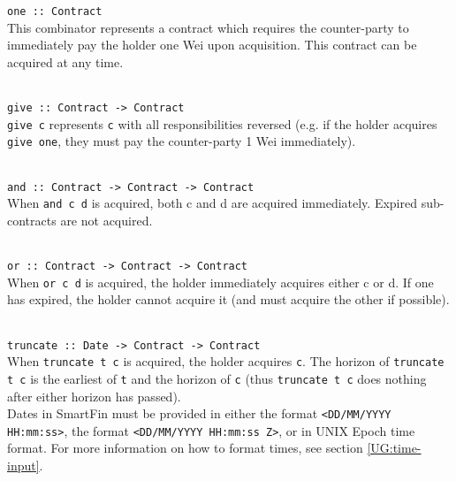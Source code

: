 \documentclass{article}
\begin{document}
\parbox{\textwidth}{
\texttt{one :: Contract} \\

This combinator represents a contract which requires the counter-party to immediately pay the holder one Wei upon acquisition. This contract can be acquired at any time. \\ \\
}

\parbox{\textwidth}{
\texttt{give :: Contract -> Contract} \\

\texttt{give c} represents \texttt{c} with all responsibilities reversed (e.g. if the holder acquires \texttt{give one}, they must pay the counter-party 1 Wei immediately). \\ \\

}

\parbox{\textwidth}{
\texttt{and :: Contract -> Contract -> Contract} \\

When \texttt{and c d} is acquired, both c and d are acquired immediately. Expired sub-contracts are not acquired. \\ \\
}

\parbox{\textwidth}{
\texttt{or :: Contract -> Contract -> Contract} \\

When \texttt{or c d} is acquired, the holder immediately acquires either c or d. If one has expired, the holder cannot acquire it (and must acquire the other if possible). \\ \\
}

\parbox{\textwidth}{
\texttt{truncate :: Date -> Contract -> Contract} \\

When \texttt{truncate t c} is acquired, the holder acquires \texttt{c}. The horizon of \texttt{truncate t c} is the earliest of \texttt{t} and the horizon of \texttt{c} (thus \texttt{truncate t c} does nothing after either horizon has passed). \\

Dates in SmartFin must be provided in either the format \texttt{<DD/MM/YYYY HH:mm:ss>}, the format \texttt{<DD/MM/YYYY HH:mm:ss Z>}, or in UNIX Epoch time format. For more information on how to format times, see section \ref{UG:time-input}. \\ \\
}
\end{document}

